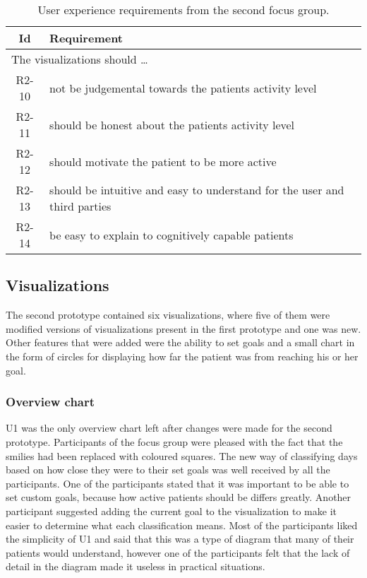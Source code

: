 \begin{table}[h!]
  \begin{center}
  \begin{tabular}{|c|p{12cm}|}
    \hline
      \textbf{Id} & \textbf{Requirement} \\ \hline
    \multicolumn{2}{|l|}{The visualizations should \ldots} \\ \hline
      R2-10 & not be judgemental towards the patients activity level \\ \hline
      R2-11 & should be honest about the patients activity level \\ \hline
      R2-12 & should motivate the patient to be more active \\ \hline
      R2-13 & should be intuitive and easy to understand for the user and third parties \\ \hline
      R2-14 & be easy to explain to cognitively capable patients \\ \hline
  \end{tabular}
  \end{center}
  \caption[User experience requirements after the second focus group]{User experience requirements from the second focus group.}
  \label{tab:uxReqFoc2}
\end{table}

\subsection{Visualizations}
The second prototype contained six visualizations, where five of them were modified versions of visualizations present in the first prototype and one was new. Other features that were added were the ability to set goals and a small chart in the form of circles for displaying how far the patient was from reaching his or her goal.

\subsubsection{Overview chart}
U1 was the only overview chart left after changes were made for the second prototype. Participants of the focus group were pleased with the fact that the smilies had been replaced with coloured squares. The new way of classifying days based on how close they were to their set goals was well received by all the participants. One of the participants stated that it was important to be able to set custom goals, because how active patients should be differs greatly. Another participant suggested adding the current goal to the visualization to make it easier to determine what each classification means. Most of the participants liked the simplicity of U1 and said that this was a type of diagram that many of their patients would understand, however one of the participants felt that the lack of detail in the diagram made it useless in practical situations.

